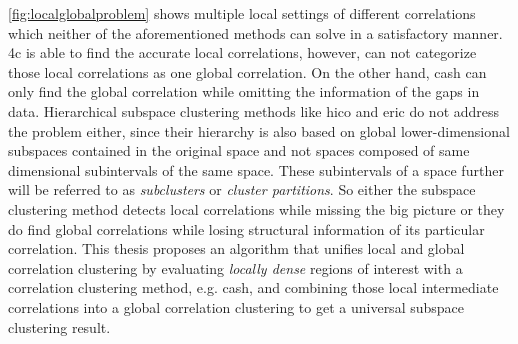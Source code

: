 \autoref{fig:localglobalproblem}  shows multiple local settings of different correlations which neither of the aforementioned methods can solve in a satisfactory manner. \gls{4c} is able to find the accurate local correlations, however, can not categorize those local correlations as one global correlation. 
On the other hand, \gls{cash} can only find the global correlation while omitting the information of the gaps in data. Hierarchical subspace clustering methods like \acrshort{hico} and \acrshort{eric} do not address the problem either, since their hierarchy is also based on global lower-dimensional subspaces contained in the original space and not spaces composed of same dimensional subintervals of the same space. 
These subintervals of a space further will be referred to as \textit{subclusters} or \textit{cluster partitions}.
So either the subspace clustering method detects local correlations while missing the big picture or they do find global correlations while losing structural information of its particular correlation. This thesis proposes an algorithm that unifies local and global correlation clustering by evaluating \textit{locally dense} regions of interest with a correlation clustering method, e.g. \gls{cash}, and combining those local intermediate correlations into a global correlation clustering to get a universal subspace clustering result. 


